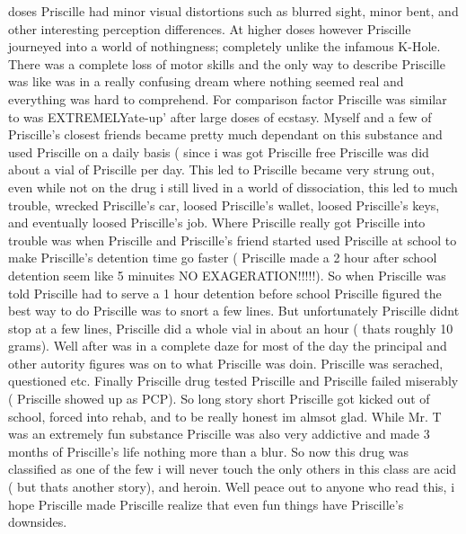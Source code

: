 \documentclass[12pt]{book}
\begin{document}
doses Priscille had minor visual distortions such as blurred sight, minor bent, and other interesting perception differences. At higher doses however Priscille journeyed into a world of nothingness; completely unlike the infamous K-Hole. There was a complete loss of motor skills and the only way to describe Priscille was like was in a really confusing dream where nothing seemed real and everything was hard to comprehend. For comparison factor Priscille was similar to was EXTREMELYate-up' after large doses of ecstasy. Myself and a few of Priscille's closest friends became pretty much dependant on this substance and used Priscille on a daily basis ( since i was got Priscille free Priscille was did about a vial of Priscille per day. This led to Priscille became very strung out, even while not on the drug i still lived in a world of dissociation, this led to much trouble, wrecked Priscille's car, loosed Priscille's wallet, loosed Priscille's keys, and eventually loosed Priscille's job. Where Priscille really got Priscille into trouble was when Priscille and Priscille's friend started used Priscille at school to make Priscille's detention time go faster ( Priscille made a 2 hour after school detention seem like 5 minuites NO EXAGERATION!!!!!). So when Priscille was told Priscille had to serve a 1 hour detention before school Priscille figured the best way to do Priscille was to snort a few lines. But unfortunately Priscille didnt stop at a few lines, Priscille did a whole vial in about an hour ( thats roughly 10 grams). Well after was in a complete daze for most of the day the principal and other autority figures was on to what Priscille was doin. Priscille was serached, questioned etc. Finally Priscille drug tested Priscille and Priscille failed miserably ( Priscille showed up as PCP). So long story short Priscille got kicked out of school, forced into rehab, and to be really honest im almsot glad. While Mr. T was an extremely fun substance Priscille was also very addictive and made 3 months of Priscille's life nothing more than a blur. So now this drug was classified as one of the few i will never touch the only others in this class are acid ( but thats another story), and heroin. Well peace out to anyone who read this, i hope Priscille made Priscille realize that even fun things have Priscille's downsides.
\end{document}
